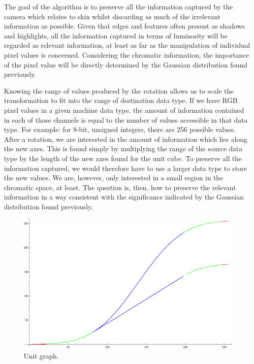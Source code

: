 The goal of the algorithm is to preserve all the information captured by the camera which relates to skin whilst discarding as much of the irrelevant information as possible. Given that edges and features often present as shadows and highlights, all the information captured in terms of luminosity will be regarded as relevant information, at least as far as the manipulation of individual pixel values is concerned. Considering the chromatic information, the importance of the pixel value will be directly determined by the Gaussian distribution found previously.

Knowing the range of values produced by the rotation allows us to scale the transformation to fit into the range of destination data type. If we have RGB pixel values in a given machine data type, the amount of information contained in each of those channels is equal to the number of values accessible in that data type. For example: for 8-bit, unsigned integers, there are 256 possible values. After a rotation, we are interested in the amount of information which lies along the new axes. This is found simply by multiplying the range of the source data type by the length of the new axes found for the unit cube. To preserve all the information captured, we would therefore have to use a larger data type to store the new values. We are, however, only interested in a small region in the chromatic space, at least. The question is, then, how to preserve the relevant information in a way consistent with the significance indicated by the Gaussian distribution found previously.





\begin{figure}[h!]
  \centering
    \includegraphics[width=\textwidth]{Chapter2/Figs/unitGraph.eps}
    \caption{Unit graph.}  \label{fig:UnitGraph}
\end{figure}


